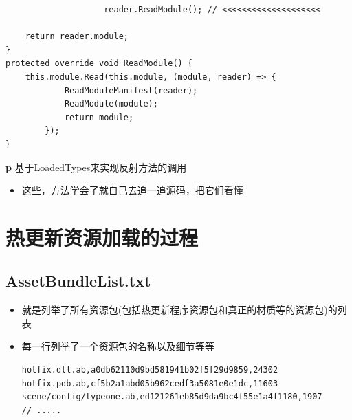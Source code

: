 \documentclass[9pt, b5paper]{article}
\begin{document}
\begin{enumerate}
\begin{enumerate}
\begin{itemize}
\begin{verbatim}
                    reader.ReadModule(); // <<<<<<<<<<<<<<<<<<<< 

    return reader.module;
}
protected override void ReadModule() {
    this.module.Read(this.module, (module, reader) => {
            ReadModuleManifest(reader);
            ReadModule(module);
            return module;
        });
}
\end{verbatim}
\end{itemize}
\textbf{p} 基于LoadedTypes来实现反射方法的调用
\begin{itemize}
\item 这些，方法学会了就自己去追一追源码，把它们看懂
\end{itemize}
\end{enumerate}
\end{enumerate}

\section{热更新资源加载的过程}
\label{sec-10}
\subsection{AssetBundleList.txt}
\label{sec-10-1}
\begin{itemize}
\item 就是列举了所有资源包(包括热更新程序资源包和真正的材质等的资源包)的列表
\item 每一行列举了一个资源包的名称以及细节等等
\begin{verbatim}
hotfix.dll.ab,a0db62110d9bd581941b02f5f29d9859,24302
hotfix.pdb.ab,cf5b2a1abd05b962cedf3a5081e0e1dc,11603
scene/config/typeone.ab,ed121261eb85d9da9bc4f55e1a4f1180,1907
// .....
\end{verbatim}
\end{itemize}
\end{document}
